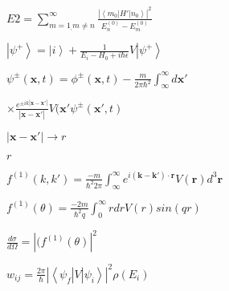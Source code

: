 \documentclass[11pt,article]{article}
\def\lthtmlcheckvsize{\ifdim\ht\sizebox<\vsize 
  \ifdim\wd\sizebox<\hsize\expandafter\hfill\fi \expandafter\vfill
  \else\expandafter\vss\fi}%
\begin{document}
{\newpage\clearpage
{}%
$\displaystyle E2 =\sum_{m=1_, m\neq n}^{\infty} \frac{\left|\left\langle m_0\right|H'\left|n_0\right\rangle \right|^2}{E_n^{(0)}-E_m^{(0)}}$%
\lthtmlindisplaymathZ
\lthtmlcheckvsize\clearpage}

{\newpage\clearpage
{}%
$\displaystyle \left|\psi^+\right\rangle  = \left|i\right\rangle  + \frac{1}{E_i - H_0 + i \hbar  \epsilon}V\left|\psi^+\right\rangle$%
\lthtmlindisplaymathZ
\lthtmlcheckvsize\clearpage}

{\newpage\clearpage
{}%
$\displaystyle \psi^{\pm}(\mathbf{x},t) = \phi^{\pm}(\mathbf{x},t) - \frac{m}{2\pi\hbar^2}\int_{\infty}^{\infty}d\mathbf{x'}$%
\lthtmlindisplaymathZ
\lthtmlcheckvsize\clearpage}

{\newpage\clearpage
{}%
$\displaystyle \times \frac{e^{ \pm i k \left|\mathbf{x}-\mathbf{x'}\right|}}{\left|\mathbf{x}-\mathbf{x'}\right|}V(\mathbf{x'}\psi^{\pm}(\mathbf{x'},t)$%
\lthtmlindisplaymathZ
\lthtmlcheckvsize\clearpage}

{\newpage\clearpage
{}%
$ \left|\mathbf{x}-\mathbf{x'}\right|\rightarrow r$%
\lthtmlindisplaymathZ
\lthtmlcheckvsize\clearpage}

{\newpage\clearpage
{}%
$ r$%
\lthtmlindisplaymathZ
\lthtmlcheckvsize\clearpage}

{\newpage\clearpage
{}%
$\displaystyle f^{(1)}(k,k') = \frac{-m}{\hbar^2 2 \pi}\int_{\infty}^{\infty}e^{i(\mathbf{k}-\mathbf{k'})\cdot\mathbf{r}} V(\mathbf{r})d^3\mathbf{r}$%
\lthtmlindisplaymathZ
\lthtmlcheckvsize\clearpage}

{\newpage\clearpage
{}%
$\displaystyle f^{(1)}(\theta) = \frac{-2m}{\hbar^2q} \int_0^{\infty} r dr V(r) sin(qr)$%
\lthtmlindisplaymathZ
\lthtmlcheckvsize\clearpage}

{\newpage\clearpage
{}%
$\displaystyle \frac{d\sigma}{d\Omega} = \left|(f^{(1)}(\theta)\right|^2$%
\lthtmlindisplaymathZ
\lthtmlcheckvsize\clearpage}

{\newpage\clearpage
{}%
$\displaystyle w_{ij} = \frac{2\pi}{\hbar}\left|\left\langle\psi_f\right|V\left|\psi_i\right\rangle \right|^2 \rho(E_i)$%
\lthtmlindisplaymathZ
\lthtmlcheckvsize\clearpage}
\end{document}
